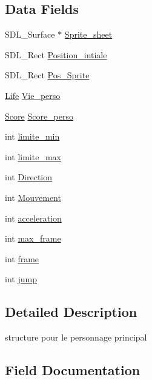 \subsection*{Data Fields}
\begin{DoxyCompactItemize}
\item 
S\+D\+L\+\_\+\+Surface $\ast$ \hyperlink{structPersonnage__Principal_a9ae86c3cfc13f35afabffac632cd9274}{Sprite\+\_\+sheet}
\item 
S\+D\+L\+\_\+\+Rect \hyperlink{structPersonnage__Principal_a1d3adc7ba5a683c3170addb0be59414f}{Position\+\_\+intiale}
\item 
S\+D\+L\+\_\+\+Rect \hyperlink{structPersonnage__Principal_aae3f91b7533eaff379444b2a099cdabc}{Pos\+\_\+\+Sprite}
\item 
\hyperlink{structLife}{Life} \hyperlink{structPersonnage__Principal_a5d7356f35759733b870eab1f598bcd2e}{Vie\+\_\+perso}
\item 
\hyperlink{structScore}{Score} \hyperlink{structPersonnage__Principal_a92c56f66fbf10945b1ed7ed3163c6c99}{Score\+\_\+perso}
\item 
int \hyperlink{structPersonnage__Principal_ab1859deae3c17ed820bd9c2eb2a67f00}{limite\+\_\+min}
\item 
int \hyperlink{structPersonnage__Principal_a096c666c96d412155d978951abcd4691}{limite\+\_\+max}
\item 
int \hyperlink{structPersonnage__Principal_a2a4fd91e82c16257be3b3675bcf4fc8f}{Direction}
\item 
int \hyperlink{structPersonnage__Principal_a2a942d64b6c4affbbd7917f7d83724d4}{Mouvement}
\item 
int \hyperlink{structPersonnage__Principal_aa94e2bfad60dee47da88d7862e9dbb1b}{acceleration}
\item 
int \hyperlink{structPersonnage__Principal_aacb52649fa0a8f0e822d03837ce3ed83}{max\+\_\+frame}
\item 
int \hyperlink{structPersonnage__Principal_aee6abfc2eb74dd9aceb9437b6b734bc2}{frame}
\item 
int \hyperlink{structPersonnage__Principal_a4dd6ca03003b960b83689e04fb30c43a}{jump}
\end{DoxyCompactItemize}


\subsection{Detailed Description}
structure pour le personnage principal 

\subsection{Field Documentation}
\mbox{\label{structPersonnage__Principal_aa94e2bfad60dee47da88d7862e9dbb1b}} 
